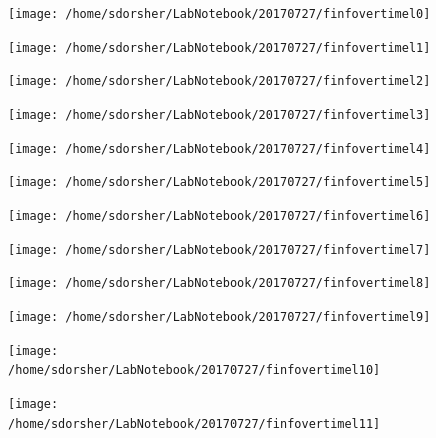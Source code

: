 \documentclass{article}
\begin{document}
\begin{figure}
  \texttt{[image: /home/sdorsher/LabNotebook/20170727/finfovertimel0]}
\end{figure}

\begin{figure}
  \texttt{[image: /home/sdorsher/LabNotebook/20170727/finfovertimel1]}
\end{figure}

\begin{figure}
  \texttt{[image: /home/sdorsher/LabNotebook/20170727/finfovertimel2]}
\end{figure}

\begin{figure}
  \texttt{[image: /home/sdorsher/LabNotebook/20170727/finfovertimel3]}
\end{figure}

\begin{figure}
  \texttt{[image: /home/sdorsher/LabNotebook/20170727/finfovertimel4]}
\end{figure}

\begin{figure}
  \texttt{[image: /home/sdorsher/LabNotebook/20170727/finfovertimel5]}
\end{figure}

\begin{figure}
  \texttt{[image: /home/sdorsher/LabNotebook/20170727/finfovertimel6]}
\end{figure}

\begin{figure}
  \texttt{[image: /home/sdorsher/LabNotebook/20170727/finfovertimel7]}
\end{figure}




\begin{figure}
  \texttt{[image: /home/sdorsher/LabNotebook/20170727/finfovertimel8]}
\end{figure}

\begin{figure}
  \texttt{[image: /home/sdorsher/LabNotebook/20170727/finfovertimel9]}
\end{figure}

\begin{figure}
  \texttt{[image: /home/sdorsher/LabNotebook/20170727/finfovertimel10]}
\end{figure}

\begin{figure}
  \texttt{[image: /home/sdorsher/LabNotebook/20170727/finfovertimel11]}
\end{figure}
\end{document}
